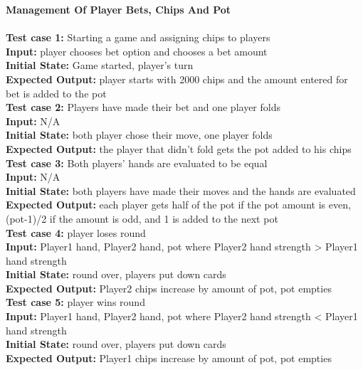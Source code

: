 \documentclass[12pt]{article}
\begin{document}
	\noindent \textbf{Management Of Player Bets, Chips And Pot}\\
	\\
	\textbf{Test case 1:} Starting a game and assigning chips to players \\
    \textbf{Input:} player chooses bet option and chooses a bet amount\\
    \textbf{Initial State:} Game started, player’s turn\\
	\textbf{Expected Output:} player starts with 2000 chips and the amount entered for bet is added to the pot\\
    
    \noindent \textbf{Test case 2:} Players have made their bet and one player folds\\
    \textbf{Input:} N/A\\
    \textbf{Initial State:} both player chose their move, one player folds\\
    \textbf{Expected Output:} the player that didn’t fold gets the pot added to his chips\\

    \noindent \textbf{Test case 3:} Both players' hands are evaluated to be equal\\
    \textbf{Input:} N/A\\
    \textbf{Initial State:} both players have made their moves and the hands are evaluated\\
	\textbf{Expected Output:} each player gets half of the pot if the pot amount is even, (pot-1)/2 if the amount is odd, and 1 is added to the next pot\\

    \noindent \textbf{Test case 4:} player loses round\\
    \textbf{Input:} Player1 hand, Player2 hand, pot where Player2 hand strength > Player1 hand 
    strength\\
    \textbf{Initial State:} round over, players put down cards\\
    \textbf{Expected Output:} Player2 chips increase by amount of pot, pot empties\\

    \noindent \textbf{Test case 5:} player wins round\\
    \textbf{Input:} Player1 hand, Player2 hand, pot where Player2 hand strength < Player1 hand 
    strength\\
    \textbf{Initial State:} round over, players put down cards\\
    \textbf{Expected Output:} Player1 chips increase by amount of pot, pot empties\\
\end{document}
